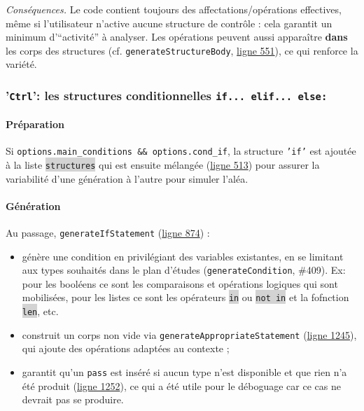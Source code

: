 \documentclass[11pt,a4paper]{article}
\newcommand{\code}[1]{\colorbox{lightgray}{\texttt{\small #1}}}
\begin{document}
\emph{Conséquences.} Le code contient toujours des affectations/opérations effectives, même si l'utilisateur n'active aucune structure de contrôle : cela garantit un minimum d'``activité'' à analyser. Les opérations peuvent aussi apparaître \textbf{dans} les corps des structures (cf. \texttt{generateStructureBody}, \href{https://github.com/edu-mateescoj/gyminf/blob/main/static/js/code-generator.js#L1083}{ligne 551}), ce qui renforce la variété.



\subsubsection{'\texttt{Ctrl}': les structures conditionnelles \texttt{if... elif... else:}}

\paragraph{Préparation} Si \texttt{options.main\_conditions \&\& options.cond\_if}, la structure \texttt{'if'} est ajoutée à la liste \code{structures} qui est ensuite mélangée (\href{https://github.com/edu-mateescoj/gyminf/blob/main/static/js/code-generator.js#L1083}{ligne 513}) pour assurer la variabilité d'une génération à l'autre pour simuler l'aléa.


\paragraph{Génération} Au passage, \texttt{generateIfStatement} (\href{https://github.com/edu-mateescoj/gyminf/blob/main/static/js/code-generator.js#L1083}{ligne 874}) :
\begin{itemize}
  \item génère une condition en privilégiant des variables existantes, en se limitant aux types souhaités dans le plan d'études (\texttt{generateCondition}, \#409). Ex: pour les booléens ce sont les comparaisons et opérations logiques qui sont mobilisées, pour les listes ce sont les opérateurs \code{in} ou \code{not in} et la fofnction \code{len}, etc.
  \item construit un corps non vide via \texttt{generateAppropriateStatement} (\href{https://github.com/edu-mateescoj/gyminf/blob/main/static/js/code-generator.js#L1083}{ligne 1245}), qui ajoute des opérations adaptées au contexte ;
  \item garantit qu'un \texttt{pass} est inséré si aucun type n'est disponible et que rien n'a été produit (\href{https://github.com/edu-mateescoj/gyminf/blob/main/static/js/code-generator.js#L1083}{ligne 1252}), ce qui a été utile pour le déboguage car ce cas ne devrait pas se produire.
\end{itemize}
\end{document}
